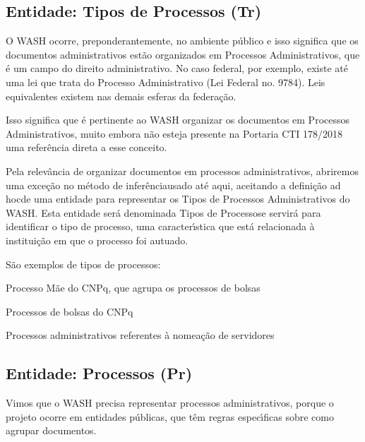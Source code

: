 \documentclass[
12pt,		%
openright,	%
twoside,  %
a4paper,			%
chapter=TITLE,		%
english,			%
french,				%
spanish,			%
brazil				%
]{USPSC-classe/USPSC}
\begin{document}
\subsection[Entidade: Tipos de Processos (Tr)]{Entidade: Tipos de Processos (Tr)}\label{Entidade: Tipos de Processos (Tr)}
O WASH ocorre, preponderantemente, no ambiente p\'ublico e isso significa que os documentos administrativos est\~ao organizados em Processos Administrativos, que \'e um campo do direito administrativo. No caso federal, por exemplo, existe at\'e uma lei que trata do Processo Administrativo (Lei Federal no. 9784). Leis equivalentes existem nas demais esferas da federa\c{c}\~ao.




Isso significa que \'e pertinente ao WASH organizar os documentos em Processos Administrativos, muito embora n\~ao esteja presente na Portaria CTI 178/2018 uma refer\^encia direta a esse conceito.




Pela relev\^ancia de organizar documentos em processos administrativos, abriremos uma exce\c{c}\~ao no \textquotedbl m\'etodo de infer\^encia\textquotedbl  usado at\'e aqui, aceitando a defini\c{c}\~ao \textquotedbl ad hoc\textquotedbl  de uma entidade para representar os Tipos de Processos Administrativos do WASH. Esta entidade ser\'a denominada \textquotedbl Tipos de Processos\textquotedbl  e servir\'a para identificar o tipo de processo, uma caracter\'{\i}stica que est\'a relacionada \`a institui\c{c}\~ao em que o processo foi autuado.




S\~ao exemplos de tipos de processos:





\begin{alineas}
\item Processo M\~ae do CNPq, que agrupa os processos de bolsas
\item Processos de bolsas do CNPq
\item Processos administrativos referentes \`a nomea\c{c}\~ao de servidores
\end{alineas}

\subsection[Entidade: Processos (Pr)]{Entidade: Processos (Pr)}\label{Entidade: Processos (Pr)}
Vimos que o WASH precisa representar processos administrativos, porque o projeto ocorre em entidades p\'ublicas, que t\^em regras espec\'{\i}ficas sobre como agrupar documentos.
\end{document}
